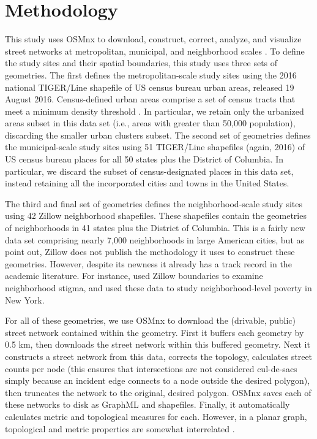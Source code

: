 \documentclass{article}
\begin{document}
\section{Methodology}
This study uses OSMnx to download, construct, correct, analyze, and visualize street networks at metropolitan, municipal, and neighborhood scales \cite{boeing_osmnx:_2017}. To define the study sites and their spatial boundaries, this study uses three sets of geometries. The first defines the metropolitan-scale study sites using the 2016 national TIGER/Line shapefile of US census bureau urban areas, released 19 August 2016. Census-defined urban areas comprise a set of census tracts that meet a minimum density threshold \cite{u.s._census_bureau_2010_2010}. In particular, we retain only the urbanized areas subset in this data set (i.e., areas with greater than 50,000 population), discarding the smaller urban clusters subset. The second set of geometries defines the municipal-scale study sites using 51 TIGER/Line shapefiles (again, 2016) of US census bureau places for all 50 states plus the District of Columbia. In particular, we discard the subset of census-designated places in this data set, instead retaining all the incorporated cities and towns in the United States. 

The third and final set of geometries defines the neighborhood-scale study sites using 42 Zillow neighborhood shapefiles. These shapefiles contain the geometries of neighborhoods in 41 states plus the District of Columbia. This is a fairly new data set comprising nearly 7,000 neighborhoods in large American cities, but as \citet{schernthanner_spatial_2016} point out, Zillow does not publish the methodology it uses to construct these geometries. However, despite its newness it already has a track record in the academic literature. For instance, \citet{besbris_effect_2015} used Zillow boundaries to examine neighborhood stigma, and \citet{albrecht_indicator_2014} used these data to study neighborhood-level poverty in New York.

For all of these geometries, we use OSMnx to download the (drivable, public) street network contained within the geometry. First it buffers each geometry by 0.5 km, then downloads the street network within this buffered geometry. Next it constructs a street network from this data, corrects the topology, calculates street counts per node (this ensures that intersections are not considered cul-de-sacs simply because an incident edge connects to a node outside the desired polygon), then truncates the network to the original, desired polygon. OSMnx saves each of these networks to disk as GraphML and shapefiles. Finally, it automatically calculates metric and topological measures for each. However, in a planar graph, topological and metric properties are somewhat interrelated \cite{masucci_random_2009}.
\end{document}
